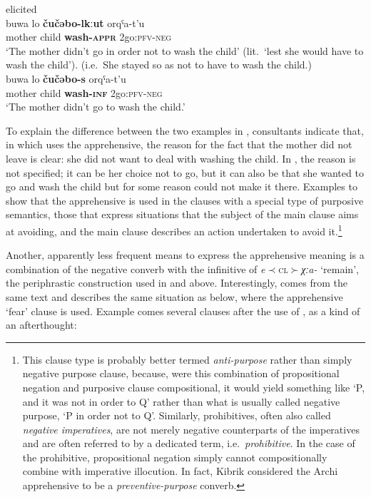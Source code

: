 \documentclass[output=paper,colorlinks,citecolor=brown]{langscibook}
\begin{document}
\ea \label{ex:DD15} \textnormal{elicited} \\
\ea \label{ex:DD15a}
\gll buwa lo \textbf{čučəbo-lkːut} o{\textlangle}r{\textrangle}qˤa-t'u \\
mother child \textbf{wash-\textsc{appr}} {\textlangle}2{\textrangle}go:\textsc{pfv-neg}\\
\glt `The mother didn't go in order not to wash the child' (lit.\ `lest she would have to wash the child'). (i.e.\   She stayed so as not to have to wash the child.)\\
\ex \label{ex:DD15b}
\gll buwa lo \textbf{čučəbo-s} o{\textlangle}r{\textrangle}qˤa-t'u \\
mother child \textbf{wash-\textsc{inf}} {\textlangle}2{\textrangle}go:\textsc{pfv-neg}\\
\glt `The mother didn't go to wash the child.'
\z
\z

\noindent To explain the difference between the two examples in , consultants indicate that, in  which uses the apprehensive, the reason for the fact that the mother did not leave is clear: she did not want to deal with washing the child. In , the reason is not specified; it can be her choice not to go, but it can also be that she wanted to go and wash the child but for some reason could not make it there. Examples  to  show that the apprehensive is used in the clauses with a special type of purposive semantics, those that express situations that the subject of the main clause aims at avoiding, and the main clause describes an action undertaken to avoid it.\footnote{This clause type is probably better termed \textit{anti-purpose} rather than simply negative purpose clause, because, were this combination of propositional negation and purposive clause  compositional, it would yield something like `P, and it was not in order to Q' rather than what is usually called negative purpose, `P in order not to Q'. Similarly, prohibitives, often also called \textit{negative imperatives}, are not merely negative counterparts of the imperatives and are often referred to by a dedicated term, i.e.\   \textit{prohibitive}. In the case of the prohibitive, propositional negation simply cannot compositionally combine with imperative illocution. In fact, Kibrik considered the Archi apprehensive to be a \textit{preventive-purpose} converb.}

Another, apparently less frequent means to express the apprehensive meaning is a combination of the negative converb with the infinitive of \textit{e}${\prec}$\textsc{cl}${\succ}$\textit{χːa-} `remain', the periphrastic construction used in  and  above. Interestingly,  comes from the same text and describes the same situation as  below, where the apprehensive `fear' clause is used. Example  comes several clauses after the use of , as a kind of an afterthought:
\end{document}
